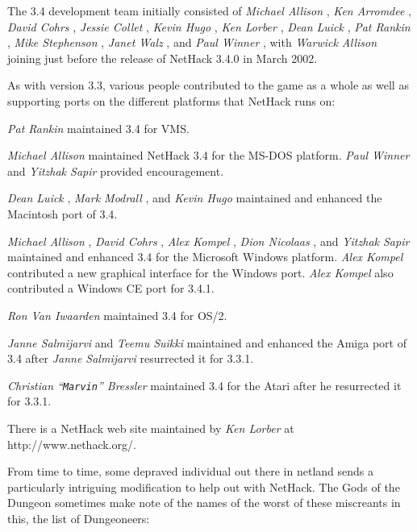 The 3.4 development team initially consisted of
%
{\it Michael Allison}%
, %
{\it Ken Arromdee}%
,
%
{\it David Cohrs}%
, %
{\it Jessie Collet}%
, %
{\it Kevin Hugo}%
, %
{\it Ken Lorber}%
,
%
{\it Dean Luick}%
, %
{\it Pat Rankin}%
, %
{\it Mike Stephenson}%
, 
%
{\it Janet Walz}%
, and %
{\it Paul Winner}%
, with  %
{\it Warwick Allison}%
joining 
just before the release of NetHack 3.4.0 in March 2002.

As with version 3.3, various people contributed to the game as a whole as
well as supporting ports on the different platforms that NetHack runs on:

%
{\it Pat Rankin}%
maintained 3.4 for VMS.

%
{\it Michael Allison}%
maintained NetHack 3.4 for the MS-DOS platform.  %
{\it Paul Winner}%
and %
{\it Yitzhak Sapir}%
provided encouragement.

%
{\it Dean Luick}%
, %
{\it Mark Modrall}%
, and %
{\it Kevin Hugo}%
maintained and enhanced the
Macintosh port of 3.4.

%
{\it Michael Allison}%
, %
{\it David Cohrs}%
, %
{\it Alex Kompel}%
, %
{\it Dion Nicolaas}%
, and 
%
{\it Yitzhak Sapir}%
maintained and enhanced 3.4 for the Microsoft Windows platform.
%
{\it Alex Kompel}%
contributed a new graphical interface for the Windows port. 
%
{\it Alex Kompel}%
also contributed a Windows CE port for 3.4.1.

%
{\it Ron Van Iwaarden}%
maintained 3.4 for OS/2.

%
{\it Janne Salmijarvi}%
and %
{\it Teemu Suikki}%
maintained and 
enhanced the Amiga port of 3.4 after %
{\it Janne Salmijarvi}%
resurrected 
it for 3.3.1.

%
{\it Christian ``{\tt Marvin}'' Bressler}%
maintained 3.4 for the Atari after he 
resurrected it for 3.3.1.

There is a NetHack web site maintained by %
{\it Ken Lorber}%
at http://www.nethack.org/.

From time to time, some depraved individual out there in netland sends a
particularly intriguing modification to help out with NetHack.  The Gods of
the Dungeon sometimes make note of the names of the worst of these miscreants
in this, the list of Dungeoneers:

